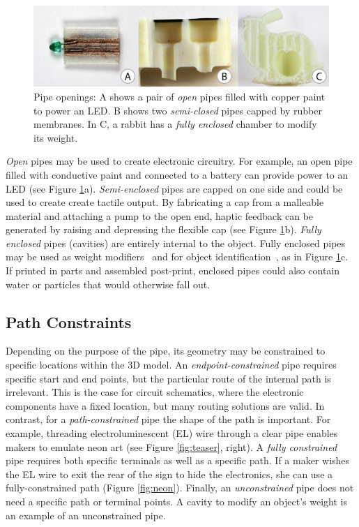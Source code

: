 \begin{figure}[t]
\centering
    \includegraphics[width=1.0\columnwidth]{figures/types.png}
\caption{Pipe openings: A shows a pair of \emph{open} pipes filled with copper paint to power an LED.  B shows two \emph{semi-closed} pipes capped by rubber membranes.  In C, a rabbit has a \emph{fully enclosed} chamber to modify its weight.}
\label{fig:openings}
\end{figure}

\emph{Open} pipes may be used to create electronic circuitry.  For example, an open pipe filled with conductive paint and connected to a battery can provide power to an LED (see Figure \ref{fig:openings}a).
%
\emph{Semi-enclosed} pipes are capped on one side and could be used to create create tactile output. By fabricating a cap from a malleable material and attaching a pump to the open end, haptic feedback can be generated by raising and depressing the flexible cap (see Figure \ref{fig:openings}b).
%
\emph{Fully enclosed} pipes (cavities) are entirely internal to the object.  Fully enclosed pipes may be used as weight modifiers~\cite{Prevost-makeitstand} and for object identification~\cite{Willis-infrastructs}, as in Figure \ref{fig:openings}c.  If printed in parts and assembled post-print, enclosed pipes could also contain water or particles that would otherwise fall out.

\subsection{Path Constraints}
Depending on the purpose of the pipe, its geometry may be constrained to specific locations within the 3D model. An \emph{endpoint-constrained} pipe requires specific start and end points, but the particular route of the internal path is irrelevant. This is the case for circuit schematics, where the electronic components have a fixed location, but many routing solutions are valid. In contrast, for a \emph{path-constrained} pipe the shape of the path is important. For example, threading electroluminescent (EL) wire through a clear pipe enables makers to emulate neon art (see Figure \ref{fig:teaser}, right). A \emph{fully constrained} pipe requires both specific terminals as well as a specific path. If a maker wishes the EL wire to exit the rear of the sign to hide the electronics, she can use a fully-constrained path (Figure \ref{fig:neon}). Finally, an \emph{unconstrained} pipe does not need a specific path or terminal points. A cavity to modify an object's weight is an example of an unconstrained pipe.

